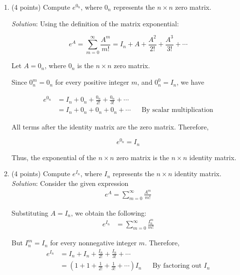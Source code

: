 \documentclass{article}
\newcommand{\reason}[1]{&& \text{#1}}
\begin{document}
\begin{enumerate}

  \item (4 points) Compute $e^{0_n}$, where $0_n$ represents the $n \times n$ zero matrix.

        \emph{Solution}: Using the definition of the matrix exponential:

        \[
          e^A=\sum_{m=0}^{\infty}\frac{A^m}{m!}
          =I_n+A+\frac{A^2}{2!}+\frac{A^3}{3!}+\cdots
        \]

        Let \(A=0_n\), where \(0_n\) is the \(n\times n\) zero matrix.

        Since \(0_n^m=0_n\) for every positive integer \(m\), and \(0_n^0 = I_n\), we have

        \begin{align*}
          e^{0_n} & =I_n + 0_n + \frac{0_n}{2!} + \frac{0_n}{3!} + \cdots             \\[1ex]
                  & =I_n + 0_n + 0_n + 0_n + \cdots \reason{By scalar multiplication}
        \end{align*}

        All terms after the identity matrix are the zero matrix. Therefore,

        \[
          \boxed{e^{0_n}=I_n}
        \]

        Thus, the exponential of the \(n\times n\) zero matrix is the \(n\times n\) identity matrix.


  \item (4 points) Compute $e^{I_n}$, where $I_n$ represents the $n \times n$ identity matrix.
        \emph{Solution}: Consider the given expression
        \begin{align*}
          e^A = \sum_{m=0}^{\infty} \frac{A^m}{m!}
        \end{align*}

        Substituting $A = I_n$, we obtain the following:
        \begin{align*}
          e^{I_n}
           & =
          \sum_{m=0}^{\infty}\frac{I_n^{m}}{m!}
        \end{align*}

        But $I^m_n = I_n$ for every nonnegative integer $m$. Therefore,
        \begin{align*}
          e^{I_n} & = I_n + I_n + \frac{I_n}{2!} + \frac{I_n}{3!} + \cdots                              \\[1ex]
                  & = (1 + 1 + \frac{1}{2!} + \frac{1}{3!} + \cdots)I_n \reason{By factoring out $I_n$}
        \end{align*}


\end{enumerate}
\end{document}
